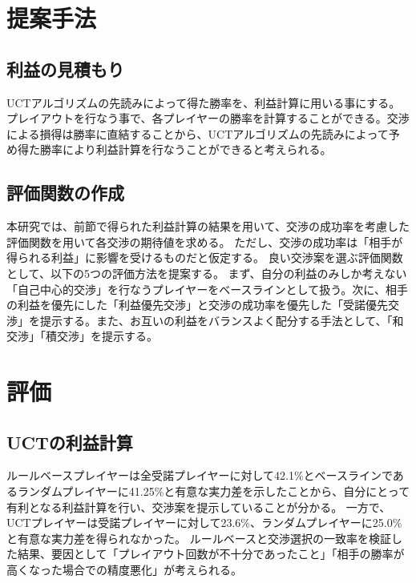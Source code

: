 \documentclass[a4, 10pt,dvipdfmx,twocolumn]{jsarticle}
\begin{document}

\section{提案手法}
\subsection{利益の見積もり}
UCTアルゴリズムの先読みによって得た勝率を、利益計算に用いる事にする。プレイアウトを行なう事で、各プレイヤーの勝率を計算することができる。交渉による損得は勝率に直結することから、UCTアルゴリズムの先読みによって予め得た勝率により利益計算を行なうことができると考えられる。

\subsection{評価関数の作成}
本研究では、前節で得られた利益計算の結果を用いて、交渉の成功率を考慮した評価関数を用いて各交渉の期待値を求める。
ただし、交渉の成功率は「相手が得られる利益」に影響を受けるものだと仮定する。
良い交渉案を選ぶ評価関数として、以下の5つの評価方法を提案する。
まず、自分の利益のみしか考えない「自己中心的交渉」を行なうプレイヤーをベースラインとして扱う。次に、相手の利益を優先にした「利益優先交渉」と交渉の成功率を優先した「受諾優先交渉」を提示する。また、お互いの利益をバランスよく配分する手法として、「和交渉」「積交渉」を提示する。


\section{評価}
\subsection{UCTの利益計算}
ルールベースプレイヤーは全受諾プレイヤーに対して42.1\%とベースラインであるランダムプレイヤーに41.25\%と有意な実力差を示したことから、自分にとって有利となる利益計算を行い、交渉案を提示していることが分かる。
一方で、UCTプレイヤーは受諾プレイヤーに対して23.6\%、ランダムプレイヤーに25.0\%と有意な実力差を得られなかった。
ルールベースと交渉選択の一致率を検証した結果、要因として「プレイアウト回数が不十分であったこと」「相手の勝率が高くなった場合での精度悪化」が考えられる。
\end{document}
